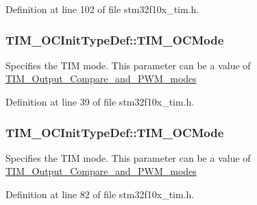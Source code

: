 Definition at line 102 of file stm32f10x\+\_\+tim.\+h.

\subsubsection[{\texorpdfstring{T\+I\+M\+\_\+\+O\+C\+Mode}{TIM_OCMode}}]{ T\+I\+M\+\_\+\+O\+C\+Init\+Type\+Def\+::\+T\+I\+M\+\_\+\+O\+C\+Mode}\hypertarget{struct_t_i_m___o_c_init_type_def_ab579643bb5aecb8e0d75af2e648cb5f6}{}\label{struct_t_i_m___o_c_init_type_def_ab579643bb5aecb8e0d75af2e648cb5f6}
Specifies the T\+IM mode. This parameter can be a value of \hyperlink{group___t_i_m___output___compare__and___p_w_m__modes}{T\+I\+M\+\_\+\+Output\+\_\+\+Compare\+\_\+and\+\_\+\+P\+W\+M\+\_\+modes} 

Definition at line 39 of file stm32f10x\+\_\+tim.\+h.

\subsubsection[{\texorpdfstring{T\+I\+M\+\_\+\+O\+C\+Mode}{TIM_OCMode}}]{ T\+I\+M\+\_\+\+O\+C\+Init\+Type\+Def\+::\+T\+I\+M\+\_\+\+O\+C\+Mode}\hypertarget{struct_t_i_m___o_c_init_type_def_ad4338ed2415b0d6d19589bf72b7ba3b0}{}\label{struct_t_i_m___o_c_init_type_def_ad4338ed2415b0d6d19589bf72b7ba3b0}
Specifies the T\+IM mode. This parameter can be a value of \hyperlink{group___t_i_m___output___compare__and___p_w_m__modes}{T\+I\+M\+\_\+\+Output\+\_\+\+Compare\+\_\+and\+\_\+\+P\+W\+M\+\_\+modes} 

Definition at line 82 of file stm32f10x\+\_\+tim.\+h.

